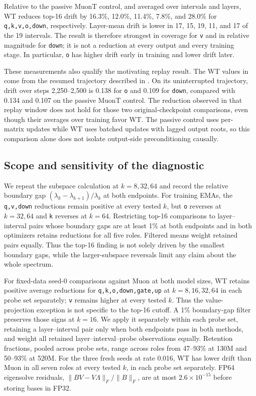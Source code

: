 Relative to the passive MuonT control, and averaged over intervals and layers, WT reduces top-16 drift by 16.3\%, 12.0\%, 11.4\%, 7.8\%, and 28.0\% for \texttt{q,k,v,o,down}, respectively. Layer-mean drift is lower in 17, 15, 19, 11, and 17 of the 19 intervals. The result is therefore strongest in coverage for \texttt{v} and in relative magnitude for \texttt{down}; it is not a reduction at every output and every training stage. In particular, \texttt{o} has higher drift early in training and lower drift later.

These measurements also qualify the motivating replay result. The WT values in  come from the resumed trajectory described in . On its uninterrupted trajectory, drift over steps 2,250--2,500 is 0.138 for \texttt{o} and 0.109 for \texttt{down}, compared with 0.134 and 0.107 on the passive MuonT control. The reduction observed in that replay window does not hold for those two original-checkpoint comparisons, even though their averages over training favor WT. The passive control uses per-matrix updates while WT uses batched updates with lagged output roots, so this comparison alone does not isolate output-side preconditioning causally.

\subsection{Scope and sensitivity of the diagnostic}

We repeat the subspace calculation at $k=8,32,64$ and record the relative boundary gap $(\lambda_k-\lambda_{k+1})/\lambda_k$ at both endpoints. For training EMAs, the \texttt{q,v,down} reductions remain positive at every tested $k$, but \texttt{o} reverses at $k=32,64$ and \texttt{k} reverses at $k=64$. Restricting top-16 comparisons to layer--interval pairs whose boundary gaps are at least 1\% at both endpoints and in both optimizers retains reductions for all five roles. Filtered means weight retained pairs equally. Thus the top-16 finding is not solely driven by the smallest boundary gaps, while the larger-subspace reversals limit any claim about the whole spectrum.

For fixed-data seed-0 comparisons against Muon at both model sizes, WT retains positive average reductions for \texttt{q,k,o,down,gate,up} at $k=8,16,32,64$ in each probe set separately; \texttt{v} remains higher at every tested $k$. Thus the value-projection exception is not specific to the top-16 cutoff. A 1\% boundary-gap filter preserves those signs at $k=16$. We apply it separately within each probe set, retaining a layer--interval pair only when both endpoints pass in both methods, and weight all retained layer--interval--probe observations equally. Retention fractions, pooled across probe sets, range across roles from 47--93\% at 130M and 50--93\% at 520M. For the three fresh seeds at rate 0.016, WT has lower drift than Muon in all seven roles at every tested $k$, in each probe set separately. FP64 eigensolve residuals, $\|BV-V\Lambda\|_F/\|B\|_F$, are at most $2.6\times10^{-15}$ before storing bases in FP32.

